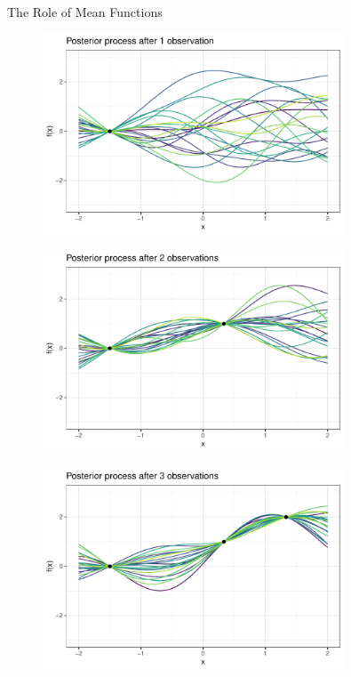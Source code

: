 \documentclass[11pt,compress,t,notes=noshow, xcolor=table]{beamer}
\begin{document}
\begin{vbframe}{The Role of Mean Functions}
\begin{itemize}
\begin{figure}
\includegraphics[width=0.8\textwidth]{figure/gp_sample/2_1.pdf}
\end{figure}

\framebreak
 


\begin{figure}
\includegraphics[width=0.8\textwidth]{figure/gp_sample/2_2.pdf}
\end{figure}

 \framebreak
 
 
\begin{figure}
\includegraphics[width=0.8\textwidth]{figure/gp_sample/2_3.pdf}
\end{figure}


\end{itemize}
\end{vbframe}
\end{document}
